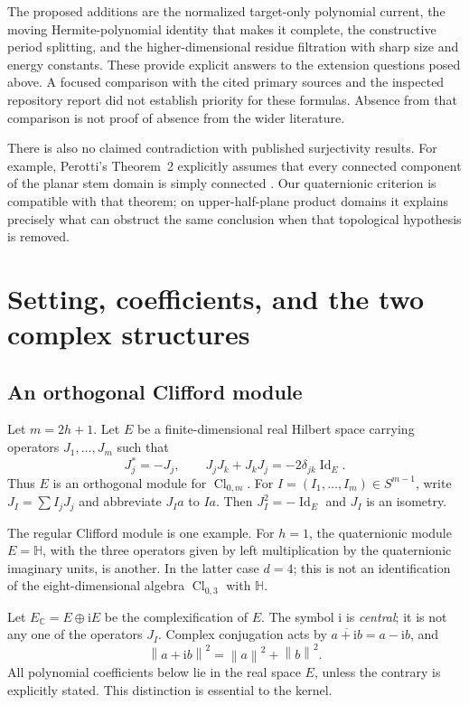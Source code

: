 \documentclass[11pt,a4paper]{article}
\numberwithin{equation}{section}
\theoremstyle{definition}
\theoremstyle{remark}
\newcommand{\C}{\mathbb C}
\newcommand{\HH}{\mathbb H}
\newcommand{\ii}{\mathrm i}
\newcommand{\Cl}{\operatorname{Cl}}
\newcommand{\norm}[1]{\left\lVert#1\right\rVert}
\begin{document}
The proposed additions are the normalized target-only polynomial current,
the moving Hermite-polynomial identity that makes it complete, the constructive
period splitting, and the higher-dimensional residue filtration with sharp
size and energy constants. These provide explicit answers to the extension
questions posed above. A focused comparison with the cited primary sources
and the inspected repository report did not establish priority for these
formulas. Absence from that comparison is not proof of absence from the wider
literature.

There is also no claimed contradiction with published surjectivity results.
For example, Perotti's Theorem~2 explicitly assumes that every connected
component of the planar stem domain is simply connected \cite{perotti2024}.
Our quaternionic criterion is compatible with that theorem; on upper-half-plane
product domains it explains precisely what can obstruct the same conclusion
when that topological hypothesis is removed.

\section{Setting, coefficients, and the two complex structures}
\label{sec:setting}

\subsection{An orthogonal Clifford module}

Let $m=2h+1$. Let $E$ be a finite-dimensional real Hilbert space carrying
operators $J_1,\ldots,J_m$ such that
\begin{equation}\label{eq:clifford}
 J_j^*=-J_j,\qquad J_jJ_k+J_kJ_j=-2\delta_{jk}\operatorname{Id}_E.
\end{equation}
Thus $E$ is an orthogonal module for $\Cl_{0,m}$. For
$I=(I_1,\ldots,I_m)\in S^{m-1}$, write $J_I=\sum I_jJ_j$ and abbreviate
$J_I a$ to $Ia$. Then $J_I^2=-\operatorname{Id}_E$ and $J_I$ is an isometry.

The regular Clifford module is one example. For $h=1$, the quaternionic
module $E=\HH$, with the three operators given by left multiplication by the
quaternionic imaginary units, is another. In the latter case $d=4$; this is
not an identification of the eight-dimensional algebra $\Cl_{0,3}$ with $\HH$.

Let $E_{\C}=E\oplus\ii E$ be the complexification of $E$. The symbol $\ii$ is
\emph{central}; it is not any one of the operators $J_I$. Complex conjugation
acts by $\overline{a+\ii b}=a-\ii b$, and
\[
 \norm{a+\ii b}^2=\norm a^2+\norm b^2.
\]
All polynomial coefficients below lie in the real space $E$, unless the
contrary is explicitly stated. This distinction is essential to the kernel.
\end{document}
